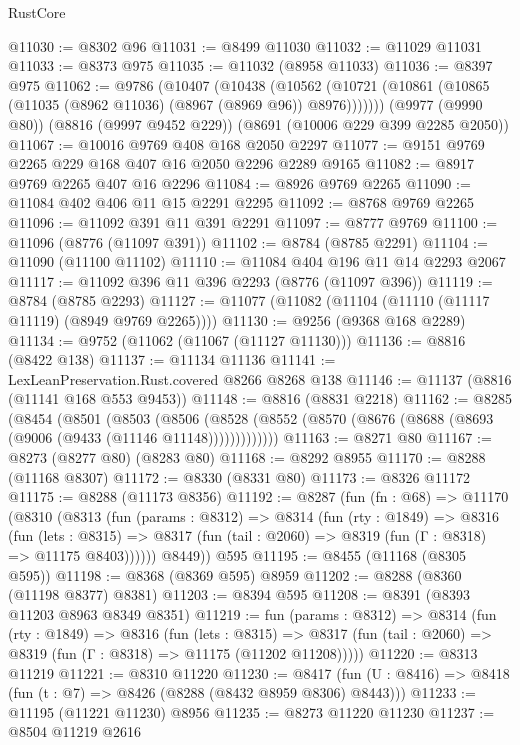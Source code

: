 \begin{lexlean}{RustCore}
\begin{coremodule}
@11030 := @8302 @96
@11031 := @8499 @11030
@11032 := @11029 @11031
@11033 := @8373 @975
@11035 := @11032 (@8958 @11033)
@11036 := @8397 @975
@11062 := @9786
    (@10407
      (@10438
        (@10562 (@10721 (@10861 (@10865 (@11035 (@8962 @11036) (@8967 (@8969 @96)) @8976)))))))
    (@9977 (@9990 @80))
    (@8816 (@9997 @9452 @229))
    (@8691 (@10006 @229 @399 @2285 @2050))
@11067 := @10016 @9769 @408 @168 @2050 @2297
@11077 := @9151 @9769 @2265 @229 @168 @407 @16 @2050 @2296 @2289 @9165
@11082 := @8917 @9769 @2265 @407 @16 @2296
@11084 := @8926 @9769 @2265
@11090 := @11084 @402 @406 @11 @15 @2291 @2295
@11092 := @8768 @9769 @2265
@11096 := @11092 @391 @11 @391 @2291
@11097 := @8777 @9769
@11100 := @11096 (@8776 (@11097 @391))
@11102 := @8784 (@8785 @2291)
@11104 := @11090 (@11100 @11102)
@11110 := @11084 @404 @196 @11 @14 @2293 @2067
@11117 := @11092 @396 @11 @396 @2293 (@8776 (@11097 @396))
@11119 := @8784 (@8785 @2293)
@11127 := @11077 (@11082 (@11104 (@11110 (@11117 @11119) (@8949 @9769 @2265))))
@11130 := @9256 (@9368 @168 @2289)
@11134 := @9752 (@11062 (@11067 (@11127 @11130)))
@11136 := @8816 (@8422 @138)
@11137 := @11134 @11136
@11141 := LexLeanPreservation.Rust.covered @8266 @8268 @138
@11146 := @11137 (@8816 (@11141 @168 @553 @9453))
@11148 := @8816 (@8831 @2218)
@11162 := @8285
    (@8454
      (@8501
        (@8503
          (@8506 (@8528 (@8552 (@8570 (@8676 (@8688 (@8693 (@9006 (@9433 (@11146 @11148)))))))))))))
@11163 := @8271 @80
@11167 := @8273 (@8277 @80) (@8283 @80)
@11168 := @8292 @8955
@11170 := @8288 (@11168 @8307)
@11172 := @8330 (@8331 @80)
@11173 := @8326 @11172
@11175 := @8288 (@11173 @8356)
@11192 := @8287
    (fun (fn : @68) =>
    @11170
      (@8310
        (@8313
          (fun (params : @8312) =>
          @8314
            (fun (rty : @1849) =>
            @8316
              (fun (lets : @8315) =>
              @8317 (fun (tail : @2060) => @8319 (fun (Γ : @8318) => @11175 @8403))))))
        @8449))
    @595
@11195 := @8455 (@11168 (@8305 @595))
@11198 := @8368 (@8369 @595) @8959
@11202 := @8288 (@8360 (@11198 @8377) @8381)
@11203 := @8394 @595
@11208 := @8391 (@8393 @11203 @8963 @8349 @8351)
@11219 := fun (params : @8312) =>
  @8314
    (fun (rty : @1849) =>
    @8316
      (fun (lets : @8315) =>
      @8317 (fun (tail : @2060) => @8319 (fun (Γ : @8318) => @11175 (@11202 @11208)))))
@11220 := @8313 @11219
@11221 := @8310 @11220
@11230 := @8417 (fun (U : @8416) => @8418 (fun (t : @7) => @8426 (@8288 (@8432 @8959 @8306) @8443)))
@11233 := @11195 (@11221 @11230) @8956
@11235 := @8273 @11220 @11230
@11237 := @8504 @11219 @2616

\end{coremodule}
\end{lexlean}
